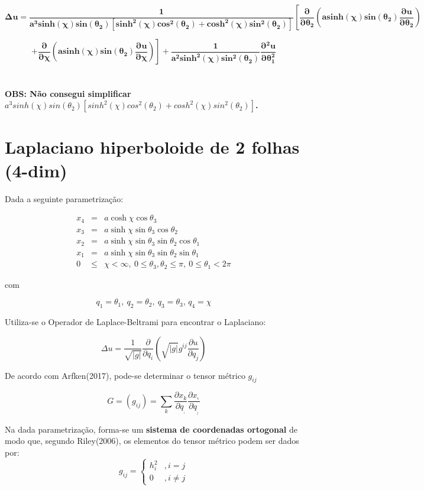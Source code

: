 \documentclass[12pt, a4papper]{article}
\begin{document}
\[
\boldsymbol{\Delta u=\frac{1}{a^{3}sinh(\chi)sin(\theta_{2})\left[sinh^{2}(\chi)cos^{2}(\theta_{2})+cosh^{2}(\chi)sin^{2}(\theta_{2})\right]}\left[\frac{\partial}{\partial\theta_{2}}\left(asinh(\chi)sin(\theta_{2})\frac{\partial u}{\partial\theta_{2}}\right) \right.}
\]

\[ \boldsymbol{ \left. +\frac{\partial}{\partial\chi}\left(asinh(\chi)sin(\theta_{2})\frac{\partial u}{\partial\chi}\right)\right] +\frac{1}{a^{2}sinh^{2}(\chi)sin^{2}(\theta_{2})}\frac{\partial{{}^2}u}{\partial\theta_{1}^{2}}} \]
\\
\\
\textbf{OBS: Não consegui simplificar $a^{3}sinh(\chi)sin(\theta_{2})\left[sinh^{2}(\chi)cos^{2}(\theta_{2})+cosh^{2}(\chi)sin^{2}(\theta_{2})\right]$.}

\section{Laplaciano hiperboloide de 2 folhas (4-dim)}

Dada a seguinte parametrização:

\begin{eqnarray*}
x_{4} & = & a\cosh\chi\cos\theta_{3}\\
x_{3} & = & a\sinh\chi\sin\theta_{3}\cos\theta_{2}\\
x_{2} & = & a\sinh\chi\sin\theta_{3}\sin\theta_{2}\cos\theta_{1}\\
x_{1} & = & a\sinh\chi\sin\theta_{3}\sin\theta_{2}\sin\theta_{1}\\
0 & \leq & \chi<\infty,\ 0\leq\theta_{3},\theta_{2}\leq\pi,\ 0\leq\theta_{1}<2\pi
\end{eqnarray*}

com

\[
q_{1}=\theta_{1},\ q_{2}=\theta_{2},\ q_{3}=\theta_{3},\,q_{4}=\chi
\]

Utiliza-se o Operador de Laplace-Beltrami para encontrar o Laplaciano:

\[
\Delta u=\frac{1}{\sqrt{\left\vert g\right\vert }}\frac{\partial}{\partial q_{i}}\left(\sqrt{\left\vert g\right\vert }g^{ij}\frac{\partial u}{\partial q_{j}}\right)
\]

De acordo com Arfken(2017), pode-se determinar o tensor métrico $g_{ij}$

\[
G=(g_{ij})=\underset{k}{\sum}\frac{\partial x_{k}}{\partial q_{_{^{i}}}}\frac{\partial x_{^{_{k}}}}{\partial q_{_{^{j}}}}
\]

Na dada parametrização, forma-se um \textbf{sistema de coordenadas
ortogonal} de modo que, segundo Riley(2006), os elementos do tensor
métrico podem ser dados por:
\[
g_{ij}=\begin{cases}
h_{i}^{2} & ,i=j\\
0 & ,i\neq j
\end{cases}
\]
\end{document}
